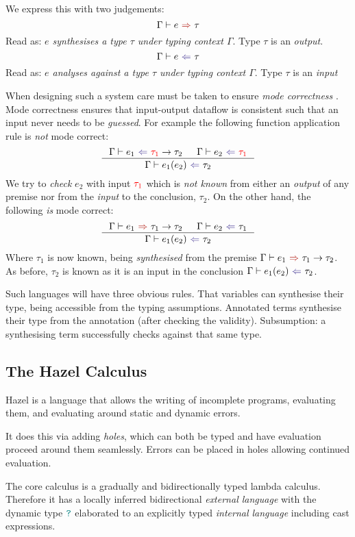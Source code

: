 We express this with two judgements:
\[\synthesis{e}{\tau}\]
Read as: \textit{$e$ synthesises a type $\tau$ under typing context $\Gamma$}. Type $\tau$ is an \textit{output}.
\[\analysis{e}{\tau}\]
Read as: \textit{$e$ analyses against a type $\tau$ under typing context $\Gamma$}. Type $\tau$ is an \textit{input}

When designing such a system care must be taken to ensure \textit{mode correctness} \cite{ModeCorrectness}. Mode correctness ensures that input-output dataflow is consistent such that an input never needs to be \textit{guessed}. For example the following function application rule is \textit{not} mode correct:
\[\inference{\analysis{e_1}{{\color{red}\tau_1} \to \tau_2} & \analysis{e_2}{{\color{red}\tau_1}}}{\analysis{e_1(e_2)}{\tau_2}}\]
We try to \textit{check} $e_2$ with input ${\color{red}\tau_1}$ which is \textit{not known} from either an \textit{output} of any premise nor from the \textit{input} to the conclusion, $\tau_2$. On the other hand, the following \textit{is} mode correct:
\[\inference{\synthesis{e_1}{\tau_1 \to \tau_2} & \analysis{e_2}{\tau_1}}{\analysis{e_1(e_2)}{\tau_2}}\]
Where $\tau_1$ is now known, being \textit{synthesised} from the premise $\synthesis{e_1}{\tau_1 \to \tau_2}$. As before, $\tau_2$ is known as it is an input in the conclusion $\analysis{e_1(e_2)}{\tau_2}$.

Such languages will have three obvious rules. That variables can synthesise their type, being accessible from the typing assumptions. Annotated terms synthesise their type from the annotation (after checking the validity). Subsumption: a synthesising term successfully checks against that same type.

\subsection{The Hazel Calculus}\label{sec:CoreHazel}
Hazel is a language that allows the writing of incomplete programs, evaluating them, and evaluating around static and dynamic errors.

It does this via adding \textit{holes}, which can both be typed and have evaluation proceed around them seamlessly. Errors can be placed in holes allowing continued evaluation.

The core calculus \cite{HazelLivePaper} is a gradually and bidirectionally typed lambda calculus. Therefore it has a locally inferred bidirectional \textit{external language} with the dynamic type ${\color{teal}\texttt{?}}$ elaborated to an explicitly typed \textit{internal language} including cast expressions. 

